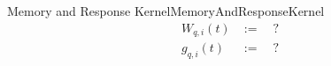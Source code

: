 \begin{mdef}{Memory and Response Kernel}{MemoryAndResponseKernel}
    \begin{align*}
        W_{q,i}(t) &:=\quad ?\\
        g_{q,i}(t) &:=\quad ?
    \end{align*}
\end{mdef}